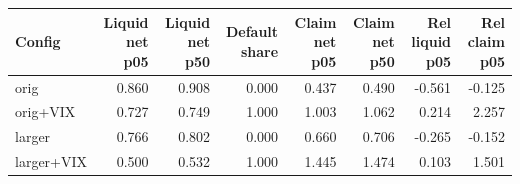 \begin{tabular}{lrrrrrrr}
\toprule
Config & Liquid net p05 & Liquid net p50 & Default share & Claim net p05 & Claim net p50 & Rel liquid p05 & Rel claim p05 \\
\midrule
orig & 0.860 & 0.908 & 0.000 & 0.437 & 0.490 & -0.561 & -0.125 \\
orig+VIX & 0.727 & 0.749 & 1.000 & 1.003 & 1.062 & 0.214 & 2.257 \\
larger & 0.766 & 0.802 & 0.000 & 0.660 & 0.706 & -0.265 & -0.152 \\
larger+VIX & 0.500 & 0.532 & 1.000 & 1.445 & 1.474 & 0.103 & 1.501 \\
\bottomrule
\end{tabular}
